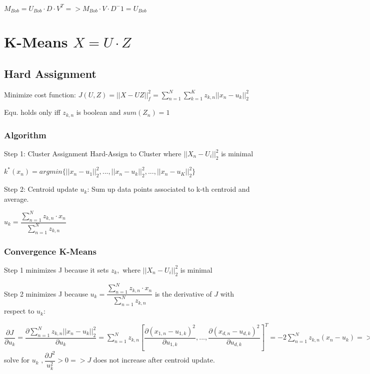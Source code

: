 \documentclass[11pt,twocolumn]{article}
\begin{document}
$M_{Bob} = U_{Bob} \cdot D \cdot V^T => M_{Bob} \cdot V \cdot D^-1 = U_{Bob}$


\section{K-Means $X = U \cdot Z$}


\subsection{Hard Assignment}

Minimize cost function:
$J(U,Z) = || X - UZ ||^2_f = \sum_{n=1}^{N}{\sum_{k=1}^{K}{z_{k,n} ||x_n - u_k||_2^2}}$


Equ. holds only iff $z_{k,n}$ is boolean and $sum(Z_n) = 1$

\subsubsection{Algorithm}

Step 1: Cluster Assignment
Hard-Assign to Cluster where
$ || X_n - U_i ||^2_2$ is minimal

\footnotesize

$ k^*(x_n) = argmin \lbrace ||x_n-u_1||_2^2,...,||x_n-u_k||_2^2,...,||x_n-u_K||_2^2 \rbrace$
\normalsize

Step 2: Centroid update $u_k$: 
Sum up data points associated to k-th centroid and average.

$u_k = \dfrac{\sum_{n=1}^N{z_{k,n} \cdot x_n}}{\sum_{n=1}^N{z_{k,n}}} $

\subsubsection{Convergence K-Means}

Step 1 minimizes J because it sets $z_k,$ where $ || X_n - U_i ||^2_2$ is minimal

Step 2 minimizes J because $u_k = \dfrac{\sum_{n=1}^N{z_{k,n} \cdot x_n}}{\sum_{n=1}^N{z_{k,n}}} $ is the derivative of $J$ with respect to $u_k$:

$\dfrac{\partial{J}}{\partial{u_k}} = \dfrac{\partial \sum_{n=1}^N{z_{k,n}} ||x_n - u_k||_2^2}{\partial{u_k}} = \sum_{n=1}^N{z_{k,n}} {\left[  	\dfrac{\partial{(x_{1,n}-u_{1,k})^2}} 	{\partial u_{1,k}}, ...,\dfrac{\partial{(x_{d,n}-u_{d,k})^2}} 	{\partial u_{d,k}}  \right]}^T = -2 \sum_{n=1}^N{z_{k,n}(x_n - u_k)} => $  solve for $u_k$
$, \dfrac{\partial{J^2}}{u_k^2} > 0 => J$ does not increase after centroid update. 
\end{document}

